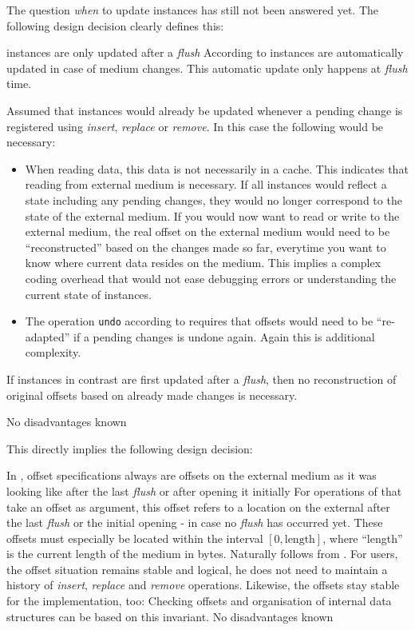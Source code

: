 The question \emph{when} to update \IMediumReference{} instances has still not been answered yet. The following design decision clearly defines this:

{%
\IMediumReference{} instances are only updated after a \emph{flush}
}
{%
According to  \IMediumReference{} instances are automatically updated in case of medium changes. This automatic update only happens at \emph{flush} time.
}
{%
Assumed that \IMediumReference{} instances would already be updated whenever a pending change is registered using \emph{insert}, \emph{replace} or \emph{remove}. In this case the following would be necessary:
\begin{itemize}
\item When reading data, this data is not necessarily in a cache. This indicates that reading from external medium is necessary. If all \IMediumReference{} instances would reflect a state including any pending changes, they would no longer correspond to the state of the external medium. If you would now want to read or write to the external medium, the real offset on the external medium would need to be ``reconstructed'' based on the changes made so far, everytime you want to know where current data resides on the medium. This implies a complex coding overhead that would not ease debugging errors or understanding the current state of instances.
\item The operation \texttt{undo} according to  requires that offsets would need to be ``re-adapted'' if a pending changes is undone again. Again this is additional complexity.
\end{itemize}
If \IMediumReference{} instances in contrast are first updated after a \emph{flush}, then no reconstruction of original offsets based on already made changes is necessary.
}
{%
No disadvantages known
}

This directly implies the following design decision:

{%
In \COMPmedia{}, offset specifications always are offsets on the external medium as it was looking like after the last \emph{flush} or after opening it initially
}
{%
For operations of \COMPmedia{} that take an offset as argument, this offset refers to a location on the external \TERMmedium{} after the last \emph{flush} or the initial opening - in case no \emph{flush} has occurred yet. These offsets must especially be located within the interval $[0, \text{length}]$, where ``length'' is the current length of the medium in bytes.
}
{%
Naturally follows from . For users, the offset situation remains stable and logical, he does not need to maintain a history of \emph{insert}, \emph{replace} and \emph{remove} operations. Likewise, the offsets stay stable for the implementation, too: Checking offsets and organisation of internal data structures can be based on this invariant.
}
{%
No disadvantages known
}

